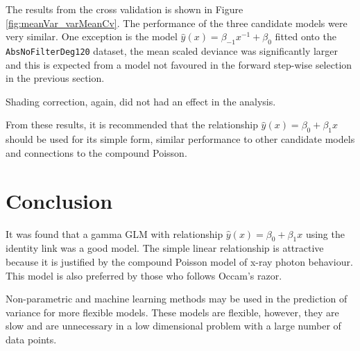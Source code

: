 The results from the cross validation is shown in Figure \ref{fig:meanVar_varMeanCv}. The performance of the three candidate models were very similar. One exception is the model $\widehat{y}(x)=\beta_{-1}x^{-1}+\beta_0$ fitted onto the \texttt{AbsNoFilterDeg120} dataset, the mean scaled deviance was significantly larger and this is expected from a model not favoured in the forward step-wise selection in the previous section.

Shading correction, again, did not had an effect in the analysis.

From these results, it is recommended that the relationship $\widehat{y}(x)=\beta_0+\beta_1 x$ should be used for its simple form, similar performance to other candidate models and connections to the compound Poisson.

\section{Conclusion}

It was found that a gamma GLM with relationship $\widehat{y}(x)=\beta_0+\beta_1 x$ using the identity link was a good model. The simple linear relationship is attractive because it is justified by the compound Poisson model of x-ray photon behaviour. This model is also preferred by those who follows Occam’s razor.

Non-parametric and machine learning methods may be used in the prediction of variance for more flexible models. These models are flexible, however, they are slow and are unnecessary in a low dimensional problem with a large number of data points.